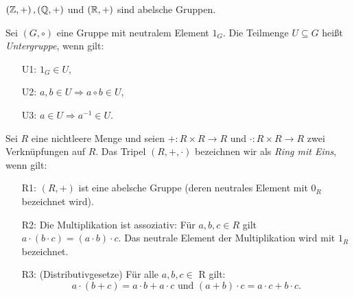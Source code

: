 %
\begin{bsp}
$\left( \mathbb{Z}, +\right), \left(\mathbb{Q}, +\right)$ und $\left(\mathbb{R}, +\right)$ sind abelsche Gruppen. 
\end{bsp}
%
\begin{defn}\label{Untergruppe}
Sei $\left(G, \circ\right)$ eine Gruppe mit neutralem Element $1_G$. Die Teilmenge $U\subseteq G$ heißt \textit{Untergruppe}, wenn gilt:
\begin{enumerate}
\item[U1: ] $1_G \in U$,
\item[U2: ] $a, b \in U \Rightarrow a\circ b \in U$,
\item[U3: ] $a \in U \Rightarrow a^{-1} \in U$.
\end{enumerate} 
\end{defn}


\begin{defn}\label{Ring} %
Sei $R$ eine nichtleere Menge und seien $+ : R \times R \to R \text{ und } \cdot: R \times R \to R $ zwei Verknüpfungen auf $R$. Das Tripel $\left(R, +, \cdot\right)$ bezeichnen wir als \textit{Ring mit Eins}, wenn gilt:
%
\begin{enumerate}
\item[R1: ] $(R, +)$ ist eine abelsche Gruppe (deren neutrales Element mit $0_R$ bezeichnet wird).
\item[R2: ] Die Multiplikation ist assoziativ: Für $a, b,c \in R$ gilt $a\cdot \left(b \cdot c\right) = \left(a \cdot b \right) \cdot c$. Das neutrale Element der Multiplikation wird mit $1_R$ bezeichnet.%
\item[R3: ] (Distributivgesetze) Für alle $a,b,c \in$ R gilt:
\[a \cdot(b +c) = a \cdot b + a \cdot c \text{ und }
(a+b) \cdot c = a \cdot c + b \cdot c. \] 
\end{enumerate}
\end{defn}


